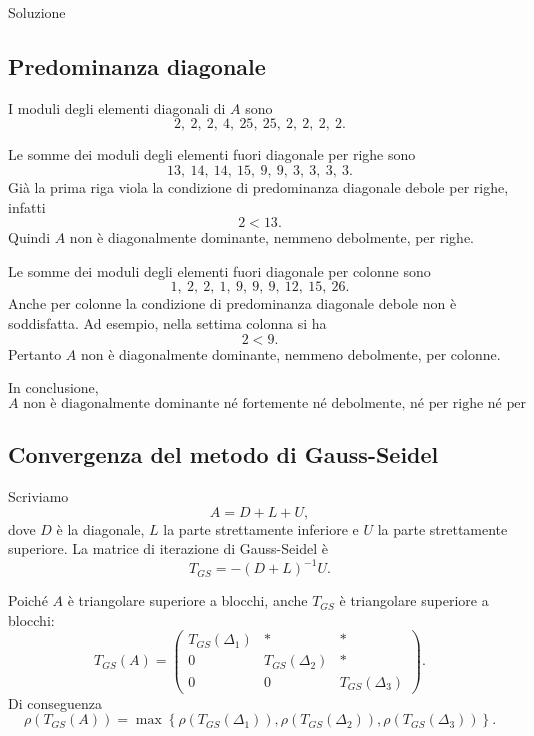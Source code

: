 \documentclass[a4paper]{article}
\begin{document}
\begin{snippetsolution}{Soluzione}
    \subsection*{Predominanza diagonale}

    I moduli degli elementi diagonali di \(A\) sono
    \[
        2,\ 2,\ 2,\ 4,\ 25,\ 25,\ 2,\ 2,\ 2,\ 2.
    \]

    Le somme dei moduli degli elementi fuori diagonale per righe sono
    \[
        13,\ 14,\ 14,\ 15,\ 9,\ 9,\ 3,\ 3,\ 3,\ 3.
    \]
    Già la prima riga viola la condizione di predominanza diagonale debole per righe, infatti
    \[
        2<13.
    \]
    Quindi \(A\) non è diagonalmente dominante, nemmeno debolmente, per righe.

    Le somme dei moduli degli elementi fuori diagonale per colonne sono
    \[
        1,\ 2,\ 2,\ 1,\ 9,\ 9,\ 9,\ 12,\ 15,\ 26.
    \]
    Anche per colonne la condizione di predominanza diagonale debole non è soddisfatta. Ad esempio, nella settima colonna si ha
    \[
        2<9.
    \]
    Pertanto \(A\) non è diagonalmente dominante, nemmeno debolmente, per colonne.

    In conclusione,
    \[
        A \text{ non è diagonalmente dominante né fortemente né debolmente, né per righe né per colonne.}
    \]

    \subsection*{Convergenza del metodo di Gauss-Seidel}

    Scriviamo
    \[
        A=D+L+U,
    \]
    dove \(D\) è la diagonale, \(L\) la parte strettamente inferiore e \(U\) la parte strettamente superiore. La matrice di iterazione di Gauss-Seidel è
    \[
        T_{GS}=-(D+L)^{-1}U.
    \]

    Poiché \(A\) è triangolare superiore a blocchi, anche \(T_{GS}\) è triangolare superiore a blocchi:
    \[
        T_{GS}(A)=
        \begin{pmatrix}
            T_{GS}(\Delta_1) & * & *\\
            0 & T_{GS}(\Delta_2) & *\\
            0 & 0 & T_{GS}(\Delta_3)
        \end{pmatrix}.
    \]
    Di conseguenza
    \[
        \rho(T_{GS}(A))
        =
        \max\left\{
            \rho(T_{GS}(\Delta_1)),
            \rho(T_{GS}(\Delta_2)),
            \rho(T_{GS}(\Delta_3))
        \right\}.
    \]


\end{snippetsolution}
\end{document}
